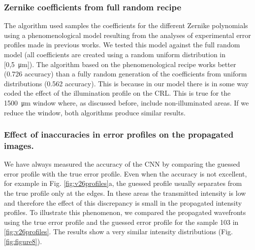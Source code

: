 \documentclass{iucr}
\begin{document}
\subsubsection{Zernike coefficients from full random recipe}
The algorithm used samples the coefficients for the different Zernike polynomials using a phenomenological model resulting from the analyses of experimental error profiles made in previous works. We tested this model against the full random model (all  coefficients are created using a random uniform distribution in [0,\SI{5}{\micro\meter}]). The algorithm based on the phenomenological recipe works better (0.726 accuracy) than a fully random generation of the coefficients from uniform distributions (0.562 accuracy). This is because in our model there is in some way coded the effect of the illumination profile on the CRL. This is true for the \SI{1500}{\micro\meter} window where, as discussed before, include non-illuminated areas. If we reduce the window, both algorithms produce similar results. 

\subsubsection{Effect of inaccuracies in error profiles on the propagated images.}
We have always measured the accuracy of the CNN by comparing the guessed error profile with the true error profile. Even when the accuracy is not excellent, for example in Fig. \ref{fig:v26profiles}a, the guessed profile usually separates from the true profile only at the edges. In these areas the transmitted intensity is low and therefore the effect of this discrepancy is small in the propagated intensity profiles. To illustrate this phenomenon, we compared the propagated wavefronts using the true error profile and the guessed error profile for the sample 103 in \ref{fig:v26profiles}. The results show a very similar intensity distributions (Fig. \ref{fig:figure8}).
\end{document}
